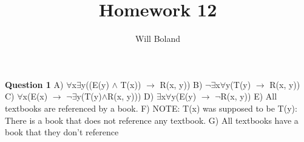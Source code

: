 \documentclass{article}
\begin{document}
\title{Homework 12}
\author{Will Boland}
\maketitle

\textbf{Question 1}\newline
A) $\forall$x$\exists$y((E(y) $\wedge$ T(x)) $\rightarrow$ R(x, y))\newline
B) $\neg$$\exists$x$\forall$y(T(y) $\rightarrow$ R(x, y))\newline
C) $\forall$x(E(x) $\rightarrow$ $\neg$$\exists$y(T(y)$\wedge$R(x, y)))\newline
D) $\exists$x$\forall$y(E(y) $\rightarrow$ $\neg$R(x, y))\newline
E) All textbooks are referenced by a book.\newline
F) NOTE: T(x) was supposed to be T(y): There is a book that does not reference any textbook.\newline
G) All textbooks have a book that they don't reference\newline\newline
\end{document}
